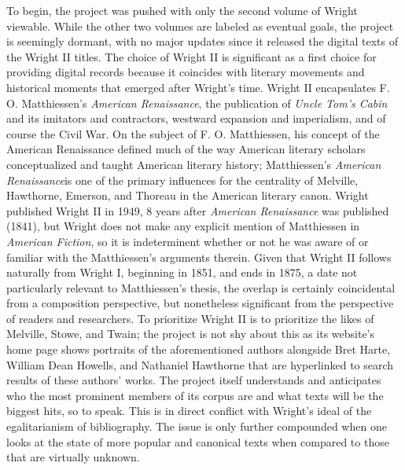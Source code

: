 To begin, the project was pushed with only the second volume of Wright viewable. While the other two volumes are labeled as eventual goals, the project is seemingly dormant, with no major updates since it released the digital texts of the Wright II titles. The choice of Wright II is significant as a first choice for providing digital records because it coincides with literary movements and historical moments that emerged after Wright's time. Wright II encapsulates F. O. Matthiessen's \textit{American Renaissance}, the publication of \textit{Uncle Tom's Cabin} and its imitators and contractors, westward expansion and imperialism, and of course the Civil War. On the subject of F. O. Matthiessen, his concept of the American Renaissance defined much of the way American literary scholars conceptualized and taught American literary history; Matthiessen's \textit{American Renaissance}is one of the primary influences for the centrality of Melville, Hawthorne, Emerson, and Thoreau in the American literary canon. Wright published Wright II in 1949, 8 years after \textit{American Renaissance} was published (1841), but Wright does not make any explicit mention of Matthiessen in \textit{American Fiction}, so it is indeterminent whether or not he was aware of or familiar with the Matthiessen's arguments therein. Given that Wright II follows naturally from Wright I, beginning in 1851, and ends in 1875, a date not particularly relevant to Matthiessen's thesis, the overlap is certainly coincidental from a composition perspective, but nonetheless significant from the perspective of readers and researchers. To prioritize Wright II is to prioritize the likes of Melville, Stowe, and Twain; the project is not shy about this as its website's home page shows portraits of the aforementioned authors alongside Bret Harte, William Dean Howells, and Nathaniel Hawthorne that are hyperlinked to search results of these authors' works. The project itself understands and anticipates who the most prominent members of its corpus are and what texts will be the biggest hits, so to speak. This is in direct conflict with Wright's ideal of the egalitarianism of bibliography. The issue is only further compounded when one looks at the state of more popular and canonical texts when compared to those that are virtually unknown. 

